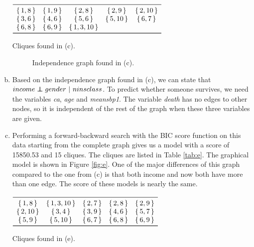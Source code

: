 \documentclass[a4paper,12pt]{scrartcl}
\newcommand\independent{\protect\mathpalette{\protect\independenT}{\perp}}
\def\independenT#1#2{\mathrel{\rlap{$#1#2$}\mkern2mu{#1#2}}}
\begin{document}
\begin{enumerate}[(a)]
		    \begin{table}[!htb]
			    \small  
		        \centering
		        $\begin{array}{ *{5}{c} }
		            \midrule
		                  \set{1,8}  & \set{1,9}  & \set{2,8} &  \set{2,9} &  \set{2,10} \\
		                  \set{3,6}  & \set{4,6}  & \set{5,6} &  \set{5,10} &  \set{6,7} \\
		                  \set{6,8}  & \set{6,9}  & \set{1,3,10} \\
		            \bottomrule
		        \end{array}$
		        \caption{Cliques found in (c).}
		        \label{tab:c}
			\end{table}
			\begin{figure}
				\centering
				
				\caption{Independence graph found in (c).}
				\label{fig:c}
			\end{figure}
		\item Based on the independence graph found in (c), we can state that $income \independent gender\ |\ ninsclass$. To predict whether someone survives, we need the variables \textit{ca}, \textit{age} and \textit{meansbp1}. The variable \textit{death} has no edges to other nodes, so it is independent of the rest of the graph when these three variables are given. 
		\item  Performing a forward-backward search with the BIC score function on this data starting from the complete graph gives us a model with a score of 15850.53 and 15 cliques. The cliques are listed in Table \ref{tab:e}. The graphical model is shown in Figure \ref{fig:e}. One of the major differences of this graph compared to the one from (c) is that both income and now both have more than one edge. The score of these models is nearly the same. 
		    \begin{table}[!htb]
			    \small  
		        \centering
		        $\begin{array}{ *{5}{c} }
		            \midrule
  						\set{1,8} & \set{1,3,10} & \set{2,7} & \set{2,8} & \set{2,9} \\
  						\set{2,10} & \set{3,4} & \set{3,9} & \set{4,6} & \set{5,7} \\
  						\set{5,9} & \set{5,10} & \set{6,7} & \set{6,8} & \set{6,9} \\ 
		            \bottomrule
		        \end{array}$
		        \caption{Cliques found in (e).}
		        \label{tab:e}
			\end{table}

\end{enumerate}
\end{document}
